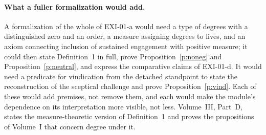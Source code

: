 \paragraph{What a fuller formalization would add.} A formalization of the whole of EXI-01-a would need a type of degrees with a distinguished zero and an order, a measure assigning degrees to lives, and an axiom connecting inclusion of sustained engagement with positive measure; it could then state Definition~1 in full, prove Proposition~\ref{p:noneg} and Proposition~\ref{p:neutral}, and express the comparative claims of EXI-01-d. It would need a predicate for vindication from the detached standpoint to state the reconstruction of the sceptical challenge and prove Proposition~\ref{p:vind}. Each of these would add premises, not remove them, and each would make the module's dependence on its interpretation more visible, not less. Volume~III, Part~D, states the measure-theoretic version of Definition~1 and proves the propositions of Volume~I that concern degree under it.

